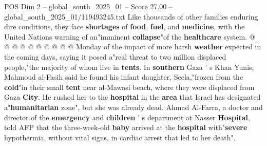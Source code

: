 \begin{textsample}{POS Dim 2 – global\_south\_2025\_01 – Score 27.00 – global\_south\_2025\_01/119493245.txt}
Like thousands of other families enduring dire conditions, they face \textbf{shortages} of \textbf{food}, \textbf{fuel}, and \textbf{medicine}, with the United Nations warning of an"imminent \textbf{collapse}"of the \textbf{healthcare} system. @ @ @ @ @ @ @ @ @ @ Monday of the impact of more harsh \textbf{weather} expected in the coming days, saying it posed a"real threat to two million displaced people,"the majority of whom live in \textbf{tents}.
In \textbf{southern} Gaza ' s Khan Yunis, Mahmoud al-Fasih said he found his infant daughter, Seela,"frozen from the \textbf{cold}"in their small \textbf{tent} near al-Mawasi beach, where they were displaced from Gaza \textbf{City}.
He rushed her to the \textbf{hospital} in the \textbf{area} that Israel has designated a"\textbf{humanitarian} zone", but she was already dead.
Ahmad Al-Farra, a doctor and director of the \textbf{emergency} and \textbf{children} ' s department at Nasser \textbf{Hospital}, told AFP that the three-week-old \textbf{baby} arrived at the \textbf{hospital} with"\textbf{severe} hypothermia, without vital signs, in cardiac arrest that led to her death".

\end{textsample}
